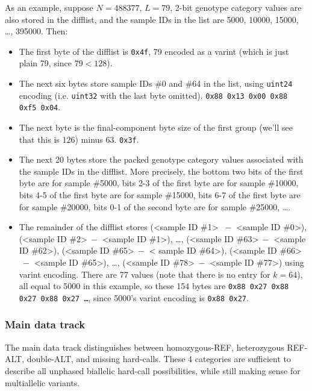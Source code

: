 \documentclass[8pt]{article}
\begin{document}
As an example, suppose $N=488377$, $L=79$, 2-bit genotype category values are
also stored in the difflist, and the sample IDs in the list are 5000, 10000,
15000, \ldots , 395000.  Then:

\begin{itemize}
\item The first byte of the difflist is \texttt{0x4f}, 79 encoded as a
  varint (which is just plain 79, since $79<128$).
\item The next six bytes store sample IDs \#0 and \#64 in the list, using
  \texttt{uint24} encoding (i.e. \texttt{uint32} with the last byte omitted).
  \texttt{0x88 0x13 0x00 0x88 0xf5 0x04}.
\item The next byte is the final-component byte size of the first group (we'll
  see that this is 126) minus 63.  \texttt{0x3f}.
\item The next 20 bytes store the packed genotype category values associated
  with the sample IDs in the difflist.  More precisely, the bottom two bits of
  the first byte are for sample \#5000, bits 2-3 of the first byte are for
  sample \#10000, bits 4-5 of the first byte are for sample \#15000, bits 6-7
  of the first byte are for sample \#20000, bits 0-1 of the second byte are for
  sample \#25000, \ldots .
\item The remainder of the difflist stores (\textless sample ID \#1\textgreater
  $\>-$ \textless sample ID \#0\textgreater ), (\textless sample ID
  \#2\textgreater $\>-$ \textless sample ID \#1\textgreater ), \ldots ,
  (\textless sample ID \#63\textgreater $\>-$ \textless sample ID
  \#62\textgreater ), (\textless sample ID \#65\textgreater $\>-$ \textless
  sample ID \#64\textgreater ), (\textless sample ID \#66\textgreater $\>-$
  \textless sample ID \#65\textgreater ), \ldots , (\textless sample ID
  \#78\textgreater $\>-$ \textless sample ID \#77\textgreater ) using varint
  encoding.  There are 77 values (note that there is no entry for $k=64$), all
  equal to 5000 in this example, so these 154 bytes are \texttt{0x88 0x27 0x88
  0x27 0x88 0x27 \ldots}, since 5000's varint encoding is \texttt{0x88 0x27}.
\end{itemize}

\subsubsection{Main data track}

The main data track distinguishes between homozygous-REF, heterozygous REF-ALT,
double-ALT, and missing hard-calls.  These 4 categories are sufficient to
describe all unphased biallelic hard-call possibilities, while still making
sense for multiallelic variants.
\end{document}
